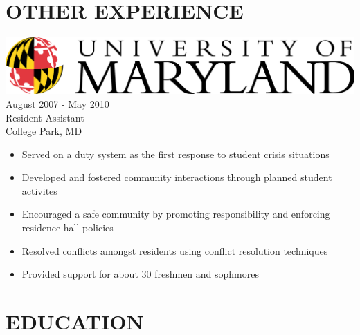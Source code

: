 \documentclass[12pt, line, margin]{res}
\begin{document}
\begin{resume}
\section{OTHER EXPERIENCE} {\sl \includegraphics[scale=0.07]{resume_images/UMD_primary[Converted].png}} \hfill August 2007 - May 2010 \\
                Resident Assistant \\
                College Park, MD
                 \begin{itemize}  \itemsep -2pt %
                 \item   Served on a duty system as the first response to student crisis situations
                 \item   Developed and fostered community interactions through planned student activites
	      \item   Encouraged a safe community by promoting responsibility and enforcing residence hall policies
	      \item   Resolved conflicts amongst residents using conflict resolution \newline techniques
	      \item   Provided support for about 30 freshmen and sophmores
                \end{itemize}

\section{EDUCATION}


\end{resume}
\end{document}
